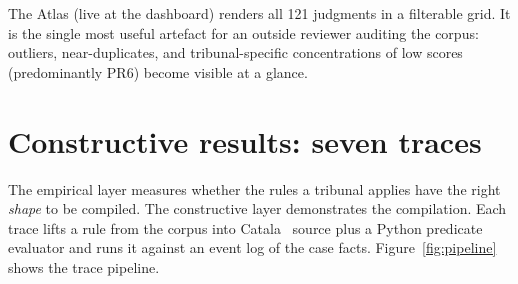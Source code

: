 \documentclass[11pt,letterpaper]{article}
\begin{document}
The Atlas (live at the dashboard) renders all 121 judgments in a filterable grid. It is the single most useful artefact for an outside reviewer auditing the corpus: outliers, near-duplicates, and tribunal-specific concentrations of low scores (predominantly PR6) become visible at a glance.

\section{Constructive results: seven traces}

The empirical layer measures whether the rules a tribunal applies have the right \textit{shape} to be compiled. The constructive layer demonstrates the compilation. Each trace lifts a rule from the corpus into Catala~\cite{catala} source plus a Python predicate evaluator and runs it against an event log of the case facts. Figure~\ref{fig:pipeline} shows the trace pipeline.
\end{document}
